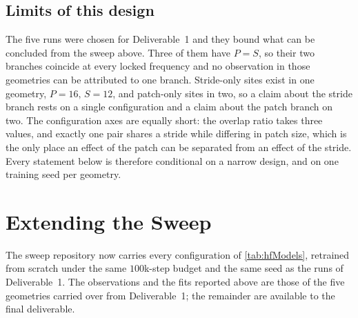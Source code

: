 \subsection{Limits of this design}
The five runs were chosen for Deliverable~1 and they bound what can be concluded from the sweep above. Three of them have $P=S$, so their two branches coincide at every locked frequency and no observation in those geometries can be attributed to one branch. Stride-only sites exist in one geometry, $P{=}16,\,S{=}12$, and patch-only sites in two, so a claim about the stride branch rests on a single configuration and a claim about the patch branch on two. The configuration axes are equally short: the overlap ratio takes three values, and exactly one pair shares a stride while differing in patch size, which is the only place an effect of the patch can be separated from an effect of the stride. Every statement below is therefore conditional on a narrow design, and on one training seed per geometry.

\section{Extending the Sweep}
\label{sec:extension}

The sweep repository now carries every configuration of \autoref{tab:hfModels}, retrained from scratch under the same $100$k-step budget and the same seed as the runs of Deliverable~1. The observations and the fits reported above are those of the five geometries carried over from Deliverable~1; the remainder are available to the final deliverable.

